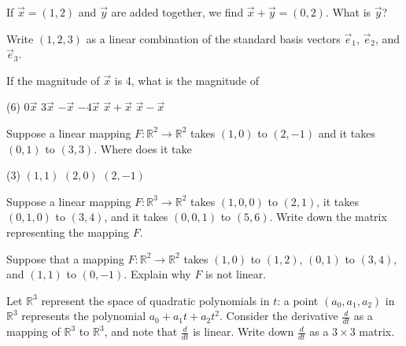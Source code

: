 \begin{exercise}
If $\vec{x} = (1,2)$ and $\vec{y}$ are added together, we find
$\vec{x}+\vec{y} = (0,2)$.  What is $\vec{y}$?
\end{exercise}

\begin{exercise}
Write $(1,2,3)$ as a linear combination of the standard basis vectors
$\vec{e}_1$, $\vec{e}_2$, and $\vec{e}_3$.
\end{exercise}

\begin{exercise}
If the magnitude of $\vec{x}$ is 4, what is the magnitude of
\begin{tasks}(6)
\task
$0\vec{x}$
\task
$3\vec{x}$
\task
$-\vec{x}$
\task
$-4\vec{x}$
\task
$\vec{x}+\vec{x}$
\task
$\vec{x}-\vec{x}$
\end{tasks}
\end{exercise}

\begin{exercise}
Suppose a linear mapping $F \colon {\mathbb R}^2 \to {\mathbb R}^2$
takes $(1,0)$ to $(2,-1)$ and it takes $(0,1)$ to $(3,3)$. 
Where does it take
\begin{tasks}(3)
\task
$(1,1)$
\task
$(2,0)$
\task
$(2,-1)$
\end{tasks}
\end{exercise}

\begin{exercise}
Suppose a linear mapping $F \colon {\mathbb R}^3 \to {\mathbb R}^2$
takes $(1,0,0)$ to $(2,1)$, it takes $(0,1,0)$ to $(3,4)$, and
it takes $(0,0,1)$ to $(5,6)$.  Write down the matrix representing
the mapping $F$.
\end{exercise}

\begin{exercise}
Suppose that a mapping $F \colon {\mathbb R}^2 \to \mathbb{R}^2$ takes
$(1,0)$ to $(1,2)$, $(0,1)$ to $(3,4)$, and $(1,1)$ to $(0,-1)$.
Explain why $F$ is not linear.
\end{exercise}

\begin{exercise}[challenging]
Let ${\mathbb R}^3$ represent the space of quadratic polynomials
in $t$: a point $(a_0,a_1,a_2)$ in ${\mathbb R}^3$ represents
the polynomial $a_0 + a_1 t + a_2 t^2$.
Consider the derivative $\frac{d}{dt}$ as a mapping of ${\mathbb R}^3$ to
${\mathbb R}^3$,
and note that $\frac{d}{dt}$ is linear.
Write down $\frac{d}{dt}$ as a $3 \times 3$ matrix.
\end{exercise}

